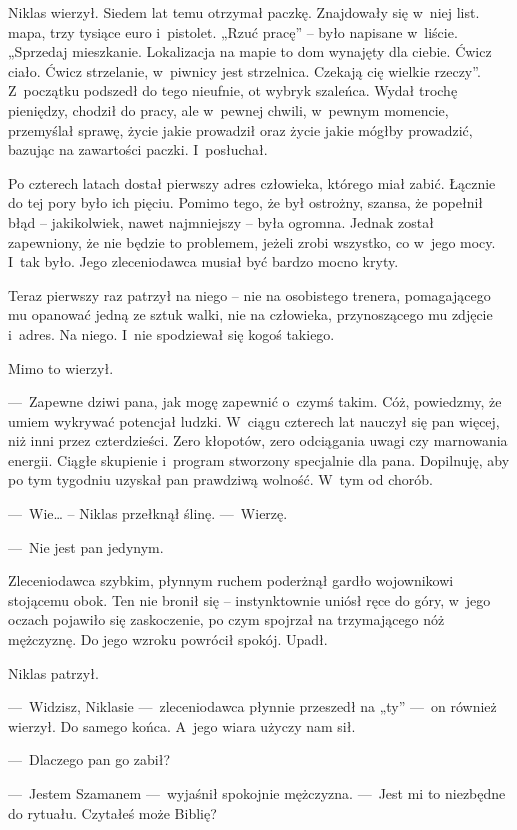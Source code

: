Niklas wierzył. Siedem lat temu otrzymał paczkę. Znajdowały się w~niej list. mapa, trzy tysiące euro i~pistolet. 
„Rzuć pracę” -- było napisane w~liście. „Sprzedaj mieszkanie. Lokalizacja na mapie to dom wynajęty dla ciebie. Ćwicz 
ciało. Ćwicz strzelanie, w~piwnicy jest strzelnica. Czekają cię wielkie rzeczy”. Z~początku podszedł do tego 
nieufnie, ot wybryk szaleńca. Wydał trochę pieniędzy, chodził do pracy, ale w~pewnej chwili, w~pewnym momencie, 
przemyślał sprawę, życie jakie prowadził oraz życie jakie mógłby prowadzić, bazując na zawartości paczki. I~posłuchał.

Po czterech latach dostał pierwszy adres człowieka, którego miał zabić. Łącznie do tej pory było ich pięciu. Pomimo 
tego, że był ostrożny, szansa, że popełnił błąd -- jakikolwiek, nawet najmniejszy -- była ogromna. Jednak został 
zapewniony, że nie będzie to problemem, jeżeli zrobi wszystko, co w~jego mocy. I~tak było. Jego zleceniodawca musiał 
być bardzo mocno kryty.

Teraz pierwszy raz patrzył na niego -- nie na osobistego trenera, pomagającego mu opanować jedną ze sztuk walki, nie 
na człowieka, przynoszącego mu zdjęcie i~adres. Na niego. I~nie spodziewał się kogoś takiego.

Mimo to wierzył.

---~Zapewne dziwi pana, jak mogę zapewnić o~czymś takim. Cóż, powiedzmy, że umiem wykrywać potencjał ludzki. W~ciągu 
czterech lat nauczył się pan więcej, niż inni przez czterdzieści. Zero kłopotów, zero odciągania uwagi czy marnowania 
energii. Ciągłe skupienie i~program stworzony specjalnie dla pana. Dopilnuję, aby po tym tygodniu uzyskał pan 
prawdziwą wolność. W~tym od chorób. 

---~Wie… – Niklas przełknął ślinę. ---~Wierzę.

---~Nie jest pan jedynym. 

Zleceniodawca szybkim, płynnym ruchem poderżnął gardło wojownikowi stojącemu obok. Ten nie bronił się -- 
instynktownie uniósł ręce do góry, w~jego oczach pojawiło się zaskoczenie, po czym spojrzał na trzymającego nóż 
mężczyznę. Do jego wzroku powrócił spokój. Upadł.

Niklas patrzył.

---~Widzisz, Niklasie ---~zleceniodawca płynnie przeszedł na „ty” ---~on również wierzył. Do samego końca. A~jego 
wiara użyczy nam sił. 

---~Dlaczego pan go zabił?

---~Jestem Szamanem ---~wyjaśnił spokojnie mężczyzna. ---~Jest mi to niezbędne do rytuału. Czytałeś może Biblię?

